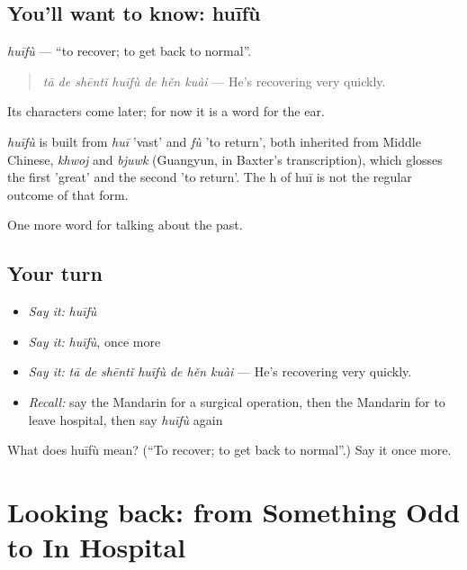 \subsection*{You'll want to know: huīfù}
\emph{huīfù} — \textquotedblleft{}to recover; to get back to normal\textquotedblright{}.

\begin{quote}
\emph{tā de shēntǐ huīfù de hěn kuài} — He's recovering very quickly.
\end{quote}

Its characters come later; for now it is a word for the ear.

\begin{cousinweb}
\emph{huīfù} is built from \emph{huī} 'vast' and \emph{fù} 'to return', both inherited from Middle Chinese, \emph{khwoj} and \emph{bjuwk} (Guangyun, in Baxter's transcription), which glosses the first 'great' and the second 'to return'. The h of huī is not the regular outcome of that form.
\end{cousinweb}

\begin{grammarlens}[title={What you've built}]
One more word for talking about the past.
\end{grammarlens}

\subsection*{Your turn}
\begin{itemize}
\raggedright
  \item \emph{Say it:} \emph{huīfù}
  \item \emph{Say it:} \emph{huīfù}, once more
  \item \emph{Say it:} \emph{tā de shēntǐ huīfù de hěn kuài} — He's recovering very quickly.
  \item \emph{Recall:} say the Mandarin for a surgical operation, then the Mandarin for to leave hospital, then say \emph{huīfù} again
\end{itemize}

\begin{tcolorbox}[breakable,colback=teal!4,colframe=teal!35!black,title={Before you move on}]
What does huīfù mean? (\textquotedblleft{}To recover; to get back to normal\textquotedblright{}.) Say it once more.
\end{tcolorbox}
\section[(dialogue)]{Looking back: from Something Odd to In Hospital}

